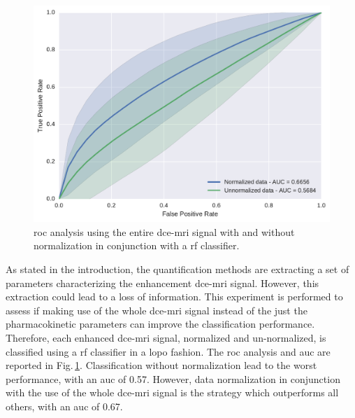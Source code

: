 \begin{figure}
  \centering
  \includegraphics[width=0.7\linewidth]{03_experiments/figures/rf.pdf}
  \caption{\acs*{roc} analysis using the entire \ac{dce}-\ac{mri} signal with and without normalization in conjunction with a \acs*{rf} classifier.}
  \label{fig:rfnormdcesignal}
\end{figure}

As stated in the introduction, the quantification methods are extracting a set of parameters characterizing the enhancement \ac{dce}-\ac{mri} signal.
However, this extraction could lead to a loss of information.
This experiment is performed to assess if making use of the whole \ac{dce}-\ac{mri} signal instead of the just the pharmacokinetic parameters can improve the classification performance.
Therefore, each enhanced \ac{dce}-\ac{mri} signal, normalized and un-normalized, is classified using a \ac{rf} classifier in a \ac{lopo} fashion.
The \ac{roc} analysis and \ac{auc} are reported in Fig.\,\ref{fig:rfnormdcesignal}.
Classification without normalization lead to the worst performance, with an \ac{auc} of 0.57.
However, data normalization in conjunction with the use of the whole \ac{dce}-\ac{mri} signal is the strategy which outperforms all others, with an \ac{auc} of 0.67.

